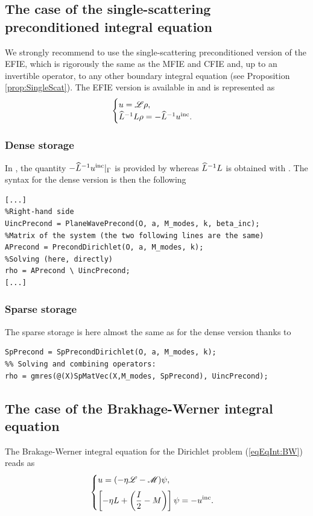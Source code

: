 \subsection{The case of the single-scattering preconditioned integral equation}
\label{secEx:PrecondD}
We strongly recommend
 to use the single-scattering preconditioned version of the EFIE, which is rigorously the same as the MFIE and CFIE and, up to an invertible operator, 
 to any other boundary integral equation (see Proposition \ref{prop:SingleScat}). The EFIE version is available in \mudiff and is represented as
$$
\begin{cases}
u = {\mathscr L}\rho,\\
\widehat{L}^{-1} L \rho = -\widehat{L}^{-1}u^{\textrm{inc}}.
\end{cases}
$$

\subsubsection{Dense storage}

In \mudiff, the quantity $-\widehat{L}^{-1}u^{\textrm{inc}}|_{\Gamma}$ is provided by \PlaneWavePrecond whereas $\widehat{L}^{-1} L$ is obtained with \PrecondDirichlet. The syntax for the dense version is then the following
\begin{lstlisting}
[...]
%Right-hand side
UincPrecond = PlaneWavePrecond(O, a, M_modes, k, beta_inc);
%Matrix of the system (the two following lines are the same)
APrecond = PrecondDirichlet(O, a, M_modes, k);
%Solving (here, directly)
rho = APrecond \ UincPrecond;
[...]
\end{lstlisting}
\medskip

\subsubsection{Sparse storage}

The sparse storage is here almost the same as for the dense version thanks to \SpPrecondDirichlet
\begin{lstlisting}
SpPrecond = SpPrecondDirichlet(O, a, M_modes, k);
%% Solving and combining operators:
rho = gmres(@(X)SpMatVec(X,M_modes, SpPrecond), UincPrecond);
\end{lstlisting}
\medskip

\subsection{The case of the Brakhage-Werner integral equation}
\label{secEx:BWIED}
The Brakage-Werner integral equation for the Dirichlet problem (\ref{eqEqInt:BW}) reads as
$$
\begin{cases}
\displaystyle u = (-\eta{\mathscr L} - {\mathscr M})\psi,\\[0.2cm]
\displaystyle \left[-\eta L +\left(\frac{I}{2} - M\right)\right]\psi = -u^{\textrm{inc}}.
\end{cases}
$$

